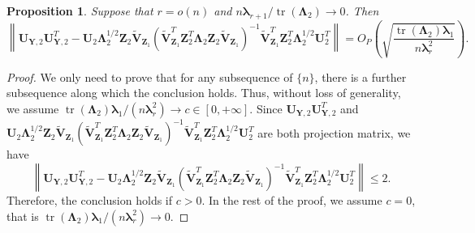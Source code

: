 \documentclass[12pt]{article} %
\DeclareMathOperator{\mytr}{tr}
\newcommand{\bZ}{\mathbf{Z}}
\newcommand{\bY}{\mathbf{Y}}
\newcommand{\bU}{\mathbf{U}}
\newcommand{\bV}{\mathbf{V}}
\newcommand{\bfsym}[1]{\ensuremath{\boldsymbol{#1}}}
\def\blambda {\bfsym {\lambda}}
\def\bLambda {\bfsym {\Lambda}}
\newtheorem{proposition}{Proposition}
\theoremstyle{definition}
\begin{document}
\begin{appendices}
\begin{proposition}
    Suppose that $r=o(n)$ and $n\blambda_{r+1} /\mytr(\bLambda_2)\to 0$. Then
    \label{eigenvectorprop2}
    \begin{equation*}
            \left\|\bU_{\bY,2}\bU_{\bY,2}^{T}-
            \bU_2 \bLambda_2^{1/2}\bZ_{2} \tilde{\bV}_{\bZ_1}
            \left(\tilde{\bV}_{\bZ_1}^T \bZ_2^T \bLambda_2 \bZ_2 \tilde{\bV}_{\bZ_1}\right)^{-1}
            \tilde{\bV}_{\bZ_1}^T \bZ_2^T \bLambda_2^{1/2} \bU_2^T
            \right\|
    = 
    O_P\left(
        \sqrt{\frac{\mytr(\bLambda_2) \blambda_1}{n\blambda_r^2}}
    \right)
    .
    \end{equation*}
\end{proposition}
\begin{proof}
    We only need to prove that for any subsequence of $\{n\}$, there is a further subsequence along which the conclusion holds.
    Thus, without loss of generality, we assume $\mytr(\bLambda_2)\blambda_1 /{(n \blambda_r^2)}\to c\in [0,+\infty]$.
    Since $
            \bU_{\bY,2}\bU_{\bY,2}^{T}
    $ and 
    $
            \bU_2 \bLambda_2^{1/2}\bZ_{2} \tilde{\bV}_{\bZ_1}
            \left(\tilde{\bV}_{\bZ_1}^T \bZ_2^T \bLambda_2 \bZ_2 \tilde{\bV}_{\bZ_1}\right)^{-1}
            \tilde{\bV}_{\bZ_1}^T \bZ_2^T \bLambda_2^{1/2} \bU_2^T
            $
            are both projection matrix, we have
    \begin{equation*}
            \left\|\bU_{\bY,2}\bU_{\bY,2}^{T}-
            \bU_2 \bLambda_2^{1/2}\bZ_{2} \tilde{\bV}_{\bZ_1}
            \left(\tilde{\bV}_{\bZ_1}^T \bZ_2^T \bLambda_2 \bZ_2 \tilde{\bV}_{\bZ_1}\right)^{-1}
            \tilde{\bV}_{\bZ_1}^T \bZ_2^T \bLambda_2^{1/2} \bU_2^T
            \right\|
            \leq 2
    .
    \end{equation*}
    Therefore, the conclusion holds if $c>0$.
    In the rest of the proof, we assume $c=0$, that is $\mytr(\bLambda_2)\blambda_1 /{(n \blambda_r^2)}\to 0$.



\end{proof}
\end{appendices}
\end{document}
